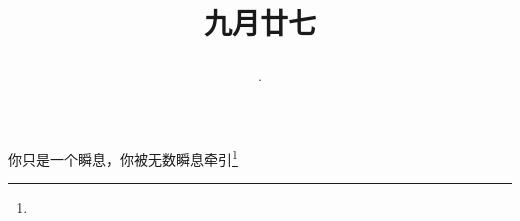 \title{\date[d=29,m=10,y=2024][year:cn-y,年,month:cn,day:cn,日,·,weekday]·九月廿七 }
你只是一个瞬息，你被无数瞬息牵引\footnote{ }

